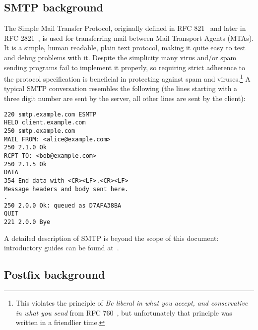 \documentclass[a4paper,12pt,draft]{article}
\begin{document}
\subsection{SMTP background}
\label{smtp background}

The Simple Mail Transfer Protocol, originally defined in RFC
821~\cite{RFC821} and later in RFC 2821~\cite{RFC2821}, is used for
transferring mail between Mail Transport Agents (MTAs).  It is a simple,
human readable, plain text protocol, making it quite easy to test and debug
problems with it.  Despite the simplicity many virus and/or spam sending
programs fail to implement it properly, so requiring strict adherence to
the protocol specification is beneficial in protecting against spam and
viruses.\footnote{This violates the principle of \textit{Be liberal in what
you accept, and conservative in what you send\/} from RFC
760~\cite{rfc760}, but unfortunately that principle was written in a
friendlier time.}  A typical SMTP conversation resembles the following (the
lines starting with a three digit number are sent by the server, all other
lines are sent by the client):

\begin{verbatim}
220 smtp.example.com ESMTP
HELO client.example.com
250 smtp.example.com
MAIL FROM: <alice@example.com>
250 2.1.0 Ok
RCPT TO: <bob@example.com>
250 2.1.5 Ok
DATA
354 End data with <CR><LF>.<CR><LF>
Message headers and body sent here.
.
250 2.0.0 Ok: queued as D7AFA38BA
QUIT
221 2.0.0 Bye
\end{verbatim}

A detailed description of SMTP is beyond the scope of this document:
introductory guides can be found at~\cite{smtp-intro-01, smtp-intro-02}.

\subsection{Postfix background}
\end{document}
